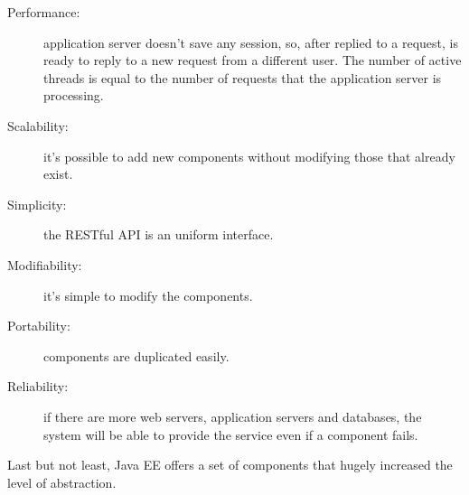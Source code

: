 \begin{description}
	\item[Performance:] application server doesn't save any session, so, after replied to a request, is ready to reply to a new request from a different user. The number of active threads is equal to the number of requests that the application server is processing.
	\item[Scalability:] it's possible to add new components without modifying those that already exist.
	\item[Simplicity:] the RESTful API is an uniform interface.
	\item[Modifiability:] it's simple to modify the components. 
	\item[Portability:] components are duplicated easily.
	\item[Reliability:] if there are more web servers, application servers and databases, the system will be able to provide the service even if a component fails.
\end{description}

Last but not least, Java EE offers a set of components that hugely increased the level of abstraction.